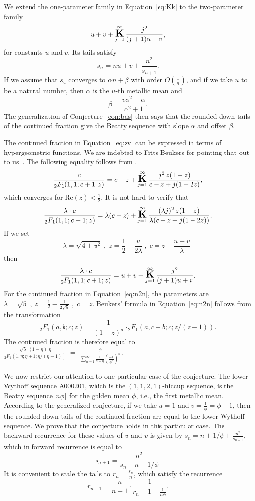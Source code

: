 \documentclass[12pt,reqno]{article}
\newcommand{\seqnum}[1]{\href{https://oeis.org/#1}{\rm \underline{#1}}}
\begin{document}
We extend the one-parameter family in Equation~\ref{eq:Kk} to
the two-parameter family
\begin{equation}\label{eq:zv}
u+v+\mathop{\mbox{\Large\bfseries K}}\limits_{j=1}^{\infty} \frac{j^2}{(j+1)u+v},
\end{equation}
for constants $u$ and $v$.
Its tails satisfy
\[
s_n=nu+v+\frac {n^2}{s_{n+1}}.  
\]
If we assume that $s_n$ converges to $\alpha n+\beta$ with order $O\left(\frac 1n\right)$,
and if we take $u$ to be a natural number,
then $\alpha$ is the $u$-th metallic mean and 
\[
\beta=\frac{v\alpha^2-\alpha}{\alpha^2+1}.
\]
The generalization of Conjecture~\ref{con:bds} then says that the rounded down tails
of the continued fraction give the Beatty sequence with slope $\alpha$ and offset $\beta$.

The continued fraction in Equation~\ref{eq:zv} can be expressed
in terms of hypergeometric functions.
We are indebted to Frits Beukers for pointing
that out to us~\cite{Beukers}. 
The following equality follows from \cite[Eq. 15.7.5]{dlmf}.
\[
\dfrac{c}{{}_2F_1(1,1;c+1;z)}
= c-z
  +\mathop{\mbox{\Large\bfseries K}}\limits_{j=1}^{\infty}
  \dfrac{j^2\,z(1-z)}{c-z+j(1-2z)},
\]
which converges for Re$(z)<\frac 12$,
It is not hard to verify that
\[
\dfrac{\lambda\cdot c}{{}_2F_1(1,1;c+1;z)}
= \lambda(c-z)
  +\mathop{\mbox{\Large\bfseries K}}\limits_{j=1}^{\infty}
  \dfrac{(\lambda j)^2\,z(1-z)}{\lambda(c-z+j(1-2z))}.
\]
If we set
\[
\lambda=\sqrt{4+u^2}\;,\; z=\dfrac 12-\dfrac{u}{2\lambda}\;,\;c=z+\dfrac{u+v}{\lambda}, 
\]
then 
\[
\dfrac{\lambda\cdot c}{{}_2F_1(1,1;c+1;z)}
= u+v+\mathop{\mbox{\Large\bfseries K}}\limits_{j=1}^{\infty} \frac{j^2}{(j+1)u+v}.
\]
For the continued fraction in Equation~\ref{eq:n2n}, the parameters
are $\lambda=\sqrt 5\;,\; z=\frac 12-\frac{1}{2\sqrt 5}\;,\; c=z$.
Beukers' formula in Equation~\ref{eq:n2n} follows from the transformation
\[
{{}_2F_1(a,b;c;z)}=\dfrac{1}{(1-z)^a}\cdot{{}_2F_1(a,c-b;c;z/(z-1))}.
\]
The continued fraction is therefore equal to
$
\tfrac{\sqrt{5}\;(1-\eta)\;\eta}
{{}_2F_1(1,\eta;\eta+1;\eta/(\eta-1))}\;=\;\tfrac{\phi}
{\sum_{n=1}^\infty \tfrac 1{n+\eta}\left(\tfrac {-1}{\phi^2}\right)^n}.
$


\medbreak
We now restrict our attention to one particular case of the conjecture.
The lower Wythoff sequence \seqnum{A000201}, which is the
$(1,1,2,1)$-hiccup sequence, is the Beatty sequence$\lfloor n\phi\rfloor$ for
the golden mean $\phi$, i.e., the first metallic mean. 
According to the generalized conjecture, if we take
$u=1$ and $v=\frac 1\phi=\phi-1$, then the rounded down tails of the
continued fraction are equal to the lower Wythoff sequence.
We prove that the conjecture holds in this particular case.
The backward recurrence for these values of $u$ and $v$ is given by $s_n=n+1/\phi+\frac {n^2}{s_{n+1}},$
which in forward recurrence is equal to
\begin{equation*}
    s_{n+1}=\frac {n^2}{s_{n}-n-1/\phi}.  
\end{equation*}
It is convenient to scale the tails to $r_n=\frac{s_n}n$, which satisfy the recurrence
\begin{equation}\label{eq:gmrecur}
    r_{n+1}=\frac{n}{n+1}\cdot \frac {1}{r_{n}-1-\frac{1}{n\phi}}.  
\end{equation}
\end{document}
